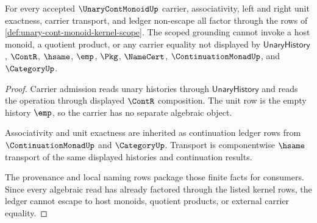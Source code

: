 \begin{theorem}
\label{thm:unary-cont-monoid-scoped-grounding}
For every accepted $\UnaryContMonoidUp$ carrier, associativity, left and right unit exactness, carrier transport, and ledger non-escape all factor through the rows of \autoref{def:unary-cont-monoid-kernel-scope}. The scoped grounding cannot invoke a host monoid, a quotient product, or any carrier equality not displayed by $\mathsf{UnaryHistory}$, $\ContR$, $\hsame$, $\emp$, $\Pkg$, $\NameCert$, $\ContinuationMonadUp$, and $\CategoryUp$.
\end{theorem}
\begin{proof}
Carrier admission reads unary histories through $\mathsf{UnaryHistory}$ and reads the operation through displayed $\ContR$ composition. The unit row is the empty history $\emp$, so the carrier has no separate algebraic object.

Associativity and unit exactness are inherited as continuation ledger rows from $\ContinuationMonadUp$ and $\CategoryUp$. Transport is componentwise $\hsame$ transport of the same displayed histories and continuation results.

The provenance and local naming rows package those finite facts for consumers. Since every algebraic read has already factored through the listed kernel rows, the ledger cannot escape to host monoids, quotient products, or external carrier equality.
\end{proof}

